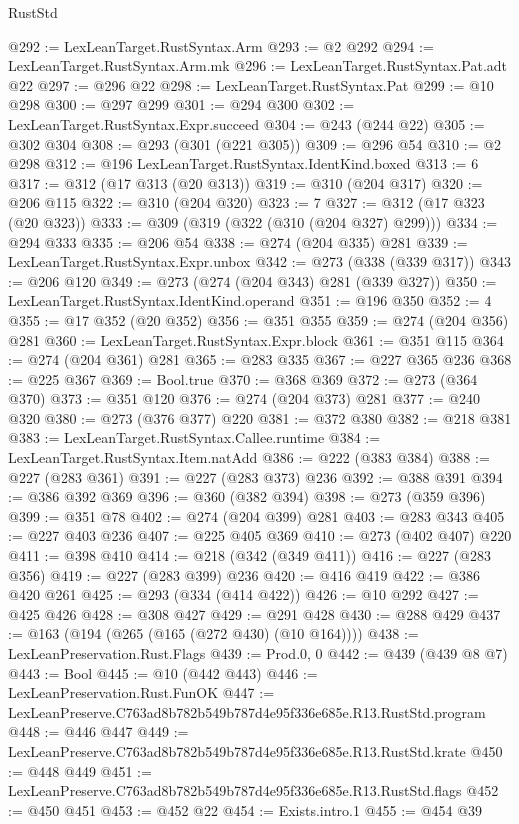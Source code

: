 \begin{lexlean}{RustStd}
\begin{coremodule}
@292 := LexLeanTarget.RustSyntax.Arm
@293 := @2 @292
@294 := LexLeanTarget.RustSyntax.Arm.mk
@296 := LexLeanTarget.RustSyntax.Pat.adt @22
@297 := @296 @22
@298 := LexLeanTarget.RustSyntax.Pat
@299 := @10 @298
@300 := @297 @299
@301 := @294 @300
@302 := LexLeanTarget.RustSyntax.Expr.succeed
@304 := @243 (@244 @22)
@305 := @302 @304
@308 := @293 (@301 (@221 @305))
@309 := @296 @54
@310 := @2 @298
@312 := @196 LexLeanTarget.RustSyntax.IdentKind.boxed
@313 := 6
@317 := @312 (@17 @313 (@20 @313))
@319 := @310 (@204 @317)
@320 := @206 @115
@322 := @310 (@204 @320)
@323 := 7
@327 := @312 (@17 @323 (@20 @323))
@333 := @309 (@319 (@322 (@310 (@204 @327) @299)))
@334 := @294 @333
@335 := @206 @54
@338 := @274 (@204 @335) @281
@339 := LexLeanTarget.RustSyntax.Expr.unbox
@342 := @273 (@338 (@339 @317))
@343 := @206 @120
@349 := @273 (@274 (@204 @343) @281 (@339 @327))
@350 := LexLeanTarget.RustSyntax.IdentKind.operand
@351 := @196 @350
@352 := 4
@355 := @17 @352 (@20 @352)
@356 := @351 @355
@359 := @274 (@204 @356) @281
@360 := LexLeanTarget.RustSyntax.Expr.block
@361 := @351 @115
@364 := @274 (@204 @361) @281
@365 := @283 @335
@367 := @227 @365 @236
@368 := @225 @367
@369 := Bool.true
@370 := @368 @369
@372 := @273 (@364 @370)
@373 := @351 @120
@376 := @274 (@204 @373) @281
@377 := @240 @320
@380 := @273 (@376 @377) @220
@381 := @372 @380
@382 := @218 @381
@383 := LexLeanTarget.RustSyntax.Callee.runtime
@384 := LexLeanTarget.RustSyntax.Item.natAdd
@386 := @222 (@383 @384)
@388 := @227 (@283 @361)
@391 := @227 (@283 @373) @236
@392 := @388 @391
@394 := @386 @392 @369
@396 := @360 (@382 @394)
@398 := @273 (@359 @396)
@399 := @351 @78
@402 := @274 (@204 @399) @281
@403 := @283 @343
@405 := @227 @403 @236
@407 := @225 @405 @369
@410 := @273 (@402 @407) @220
@411 := @398 @410
@414 := @218 (@342 (@349 @411))
@416 := @227 (@283 @356)
@419 := @227 (@283 @399) @236
@420 := @416 @419
@422 := @386 @420 @261
@425 := @293 (@334 (@414 @422))
@426 := @10 @292
@427 := @425 @426
@428 := @308 @427
@429 := @291 @428
@430 := @288 @429
@437 := @163 (@194 (@265 (@165 (@272 @430) (@10 @164))))
@438 := LexLeanPreservation.Rust.Flags
@439 := Prod.{0, 0}
@442 := @439 (@439 @8 @7)
@443 := Bool
@445 := @10 (@442 @443)
@446 := LexLeanPreservation.Rust.FunOK
@447 := LexLeanPreserve.C763ad8b782b549b787d4e95f336e685e.R13.RustStd.program
@448 := @446 @447
@449 := LexLeanPreserve.C763ad8b782b549b787d4e95f336e685e.R13.RustStd.krate
@450 := @448 @449
@451 := LexLeanPreserve.C763ad8b782b549b787d4e95f336e685e.R13.RustStd.flags
@452 := @450 @451
@453 := @452 @22
@454 := Exists.intro.{1}
@455 := @454 @39

\end{coremodule}
\end{lexlean}

